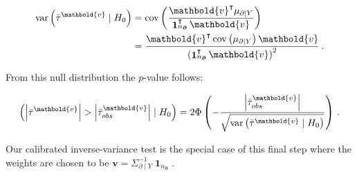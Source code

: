 \documentclass[letter]{article}
\newcommand{\genericdel}[3]{%
      \left#1#3\right#2
    }
\newcommand{\del}[1]{\genericdel(){#1}}
\let\Pr\relax
\DeclareMathOperator{\Pr}{\mathbb{P}}
\DeclareMathOperator{\cov}{{cov}}
\DeclareMathOperator{\var}{{var}}
\newcommand{\abs}[1]{\genericdel||{#1}}
\DeclareMathOperator{\ones}{\mathbf{1}}
\newcommand{\trans}{^{\intercal}}
\newcommand{\vvec}{\mathbold{v}}
\newcommand{\boundary}{\partial}
\newcommand{\sentinels}{\bm{\boundary}}
\begin{document}
\begin{equation}
\begin{aligned}
    \var\del{\bar{\tau}^\vvec \mid H_0} &= \cov\del{ \frac{\vvec \trans \mu_{\boundary \mid Y}}{\ones_{n_{\sentinels}}\trans \vvec}} \\
    &= \frac{\vvec \trans \cov \del{\mu_{\boundary \mid Y}} \vvec}{\del{\ones_{n_{\sentinels}}\trans \vvec}^2}
    \,.
\end{aligned}
\end{equation}
    


    	From this null distribution the \(p\)-value follows:

\begin{equation}
    \Pr\del{ \abs{\bar{\tau}^\vvec} > \abs{\bar{\tau}_{obs}^\vvec} \mid H_0} = 2 \Phi\del{ -\frac{\abs{\bar{\tau}_{obs}^\vvec}}{\sqrt{\var\del{\bar{\tau}^\vvec \mid H_0}}} }\,.
\end{equation}

Our calibrated inverse-variance test is the special case of this final
step where the weights are chosen to be
\(\vvec = \Sigma^{-1}_{\boundary \mid Y} \ones_{n_{\sentinels}}\).
    



    
    
	
	

    
    
\end{document}
